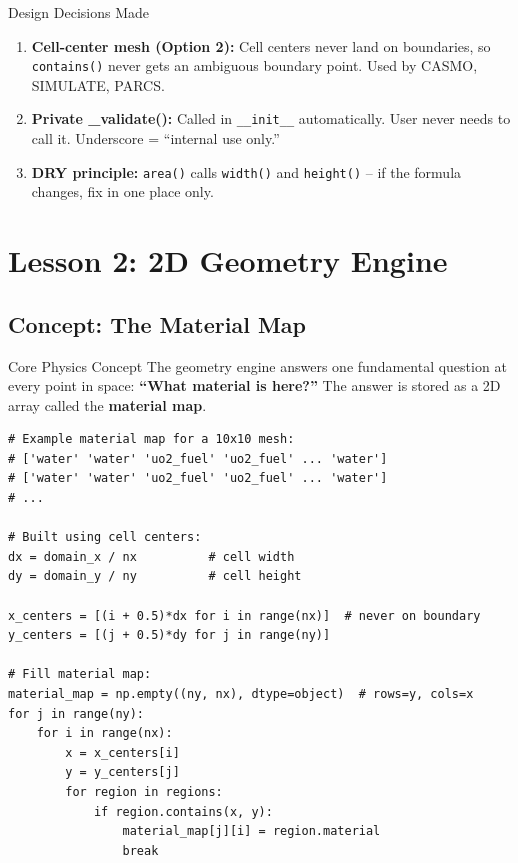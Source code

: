 \documentclass[12pt,a4paper]{article}
\begin{document}
\begin{keybox}{Design Decisions Made}
\begin{enumerate}
  \item \textbf{Cell-center mesh (Option 2):} Cell centers never land on boundaries,
        so \texttt{contains()} never gets an ambiguous boundary point.
        Used by CASMO, SIMULATE, PARCS.
  \item \textbf{Private \_validate():} Called in \texttt{\_\_init\_\_} automatically.
        User never needs to call it. Underscore = ``internal use only.''
  \item \textbf{DRY principle:} \texttt{area()} calls \texttt{width()} and
        \texttt{height()} -- if the formula changes, fix in one place only.
\end{enumerate}
\end{keybox}

\section{Lesson 2: 2D Geometry Engine}

\subsection{Concept: The Material Map}

\begin{physicsbox}{Core Physics Concept}
The geometry engine answers one fundamental question at every point in space:
\textbf{``What material is here?''} The answer is stored as a 2D array called
the \textbf{material map}.
\end{physicsbox}

\begin{lstlisting}[caption={Material Map -- 2D Array of Material Names}]
# Example material map for a 10x10 mesh:
# ['water' 'water' 'uo2_fuel' 'uo2_fuel' ... 'water']
# ['water' 'water' 'uo2_fuel' 'uo2_fuel' ... 'water']
# ...

# Built using cell centers:
dx = domain_x / nx          # cell width
dy = domain_y / ny          # cell height

x_centers = [(i + 0.5)*dx for i in range(nx)]  # never on boundary
y_centers = [(j + 0.5)*dy for j in range(ny)]

# Fill material map:
material_map = np.empty((ny, nx), dtype=object)  # rows=y, cols=x
for j in range(ny):
    for i in range(nx):
        x = x_centers[i]
        y = y_centers[j]
        for region in regions:
            if region.contains(x, y):
                material_map[j][i] = region.material
                break
\end{lstlisting}
\end{document}
